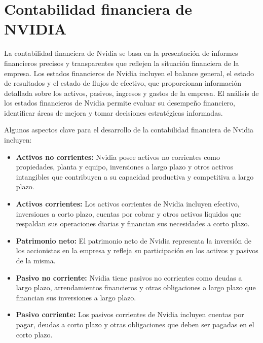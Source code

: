 \documentclass{article}
\begin{document}
\section{Contabilidad financiera de NVIDIA}

La contabilidad financiera de Nvidia se basa en la presentación de informes financieros precisos y transparentes que reflejen la situación financiera de la empresa. Los estados financieros de Nvidia incluyen el balance general, el estado de resultados y el estado de flujos de efectivo, que proporcionan información detallada sobre los activos, pasivos, ingresos y gastos de la empresa. El análisis de los estados financieros de Nvidia permite evaluar su desempeño financiero, identificar áreas de mejora y tomar decisiones estratégicas informadas.

Algunos aspectos clave para el desarrollo de la contabilidad financiera de Nvidia incluyen:


\begin{itemize}
  \item \textbf{Activos no corrientes:} Nvidia posee activos no corrientes como propiedades, planta y equipo, inversiones a largo plazo y otros activos intangibles que contribuyen a su capacidad productiva y competitiva a largo plazo.
  \item \textbf{Activos corrientes:} Los activos corrientes de Nvidia incluyen efectivo, inversiones a corto plazo, cuentas por cobrar y otros activos líquidos que respaldan sus operaciones diarias y financian sus necesidades a corto plazo.
  \item \textbf{Patrimonio neto:} El patrimonio neto de Nvidia representa la inversión de los accionistas en la empresa y refleja su participación en los activos y pasivos de la misma.
  \item \textbf{Pasivo no corriente:} Nvidia tiene pasivos no corrientes como deudas a largo plazo, arrendamientos financieros y otras obligaciones a largo plazo que financian sus inversiones a largo plazo.
  \item \textbf{Pasivo corriente:} Los pasivos corrientes de Nvidia incluyen cuentas por pagar, deudas a corto plazo y otras obligaciones que deben ser pagadas en el corto plazo.
\end{itemize}
\end{document}
